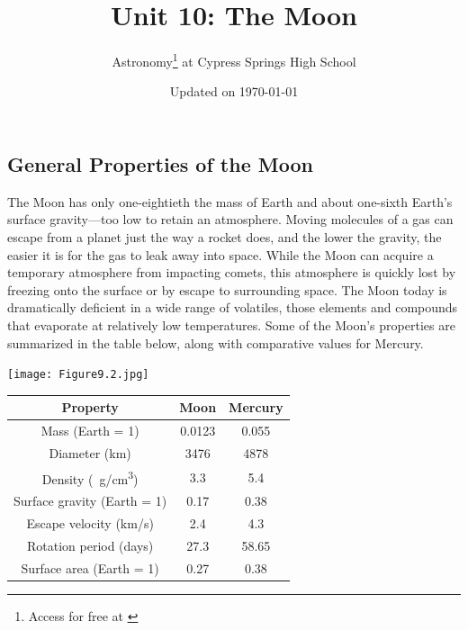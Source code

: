 \documentclass{article}
\title{Unit 10: The Moon}
\author{Astronomy\footnote{Access for free at \href{\openstax}{\openstax}} \hspace{0.1ex} at Cypress Springs High School}
\date{Updated on \today}
\numberwithin{equation}{section}
\numberwithin{figure}{section}
\begin{document}
\maketitle

\subsection{General Properties of the Moon} \label{Lg4zN5}


The Moon has only one-eightieth the mass of Earth and about one-sixth Earth's surface gravity---too low to retain an atmosphere. Moving molecules of a gas can escape from a planet just the way a rocket does, and the lower the gravity, the easier it is for the gas to leak away into space. While the Moon can acquire a temporary atmosphere from impacting comets, this atmosphere is quickly lost by freezing onto the surface or by escape to surrounding space. The Moon today is dramatically deficient in a wide range of volatiles, those elements and compounds that evaporate at relatively low temperatures. Some of the Moon's properties are summarized in the table below, along with comparative values for Mercury.

\vspace{1em}

\begin{minipage}{0.35\textwidth}
    \centering
    \texttt{[image: Figure9.2.jpg]}
\end{minipage}%
\hspace{5mm}%
\begin{minipage}{0.55\textwidth}
    \centering
\begin{tabular}{|c|c|c|}
    \hline
    \textbf{Property} & \textbf{Moon} & \textbf{Mercury} \\
    \hline
    Mass (Earth = 1) & 0.0123 &	0.055\\
    \hline
    Diameter (km) & 3476 & 4878\\
    \hline
    Density (\qty{}{g/cm^3})	& 3.3 & 5.4\\
    \hline
    Surface gravity (Earth = 1)	& 0.17 & 0.38\\
    \hline
    Escape velocity (km/s) & 2.4	& 4.3\\
    \hline
    Rotation period (days)	& 27.3 & 58.65\\
    \hline
    Surface area (Earth = 1) & 0.27	& 0.38\\
    \hline
\end{tabular}
\end{minipage}%
\end{document}
